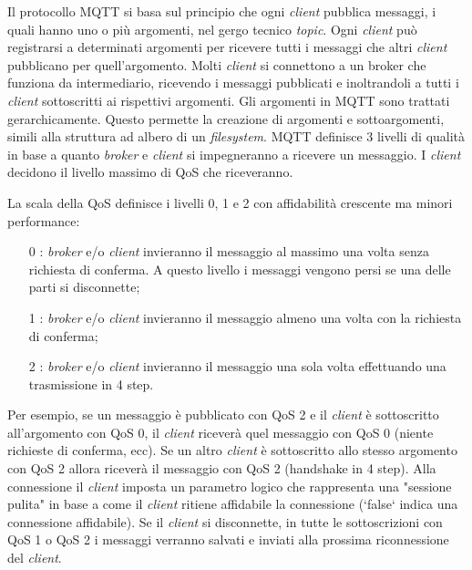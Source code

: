 Il protocollo MQTT si basa sul principio che ogni \emph{client} pubblica messaggi, i quali hanno uno o più argomenti, nel gergo tecnico \emph{topic}.
Ogni \emph{client} può registrarsi a determinati argomenti per ricevere tutti i messaggi che altri \emph{client} pubblicano per quell'argomento. Molti \emph{client} si connettono a un \gls{broker} che funziona da intermediario, ricevendo i messaggi pubblicati e inoltrandoli a tutti i \emph{client} sottoscritti ai rispettivi argomenti.
Gli argomenti in MQTT sono trattati gerarchicamente. Questo permette la creazione di argomenti e sottoargomenti, simili alla struttura ad albero di un \emph{filesystem}.
MQTT definisce 3 livelli di qualità in base a quanto \emph{broker} e \emph{client} si impegneranno a ricevere un messaggio.
I \emph{client} decidono il livello massimo di \gls{QoS} che riceveranno.

La scala della QoS definisce i livelli 0, 1 e 2 con affidabilità crescente ma minori performance:
\begin{itemize}
	\item [0]: \emph{broker} e/o \emph{client} invieranno il messaggio al massimo una volta senza richiesta di conferma. A questo livello i messaggi vengono persi se una delle parti si disconnette;
	\item [1]: \emph{broker} e/o \emph{client} invieranno il messaggio almeno una volta con la richiesta di conferma;
	\item [2]: \emph{broker} e/o \emph{client} invieranno il messaggio una sola volta effettuando una trasmissione in 4 step.
\end{itemize}

Per esempio, se un messaggio è pubblicato con QoS 2 e il \emph{client} è sottoscritto all'argomento con QoS 0, il \emph{client} riceverà quel messaggio con QoS 0 (niente richieste di conferma, ecc).
Se un altro \emph{client} è sottoscritto allo stesso argomento con QoS 2 allora riceverà il messaggio con QoS 2 (\gls{handshake} in 4 step).
Alla connessione il \emph{client} imposta un parametro logico che rappresenta una "sessione pulita" in base a come il \emph{client} ritiene affidabile la connessione (`false` indica una connessione affidabile). Se il \emph{client} si disconnette, in tutte le sottoscrizioni con QoS 1 o QoS 2 i messaggi verranno salvati e inviati alla prossima riconnessione del \emph{client}.

